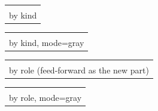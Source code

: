 \documentclass[border=8pt]{standalone}
\makeatletter
\newcommand\panel[3]{%
  \begin{tabular}[b]{@{}c@{}}
    \pvsetup{mode=#1}\transformer[#2]\\[6pt]
    \textsf{\footnotesize #3}
  \end{tabular}}
\makeatother
\begin{document}
\panel{color}{}{by kind}\hspace{18pt}%
\panel{gray}{}{by kind, mode=gray}\hspace{18pt}%
\panel{color}{pv kinds=false, ffn/.append style={pv new}}{by role (feed-forward as the new part)}\hspace{18pt}%
\panel{gray}{pv kinds=false, ffn/.append style={pv new}}{by role, mode=gray}
\end{document}
